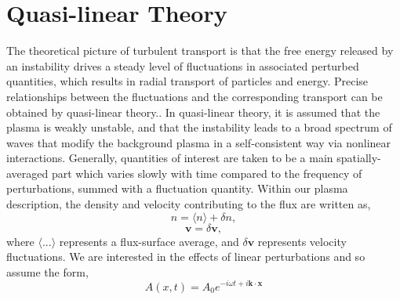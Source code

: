 \documentclass[12pt]{article}
\numberwithin{equation}{subsection}
\begin{document}
\section{Quasi-linear Theory}
   \quad The theoretical picture of turbulent transport is that the free energy released by an instability drives a steady level of
fluctuations in associated perturbed quantities, which results in radial transport of particles and energy. Precise relationships
between the fluctuations and the corresponding transport can be obtained by quasi-linear theory.\cite{WessonC}. In quasi-linear
theory, it is assumed that the plasma is weakly unstable, and that the instability leads to a broad spectrum of waves that modify
the background plasma in a self-consistent way via nonlinear interactions\cite{GurnBhatA}. Generally, quantities of interest are taken
to be a main spatially-averaged part which varies slowly with time compared to the frequency of perturbations, summed with a fluctuation
quantity. Within our plasma description, the density and velocity contributing to the flux are written as, 
   \begin{equation}
      n = \langle n \rangle + \delta n,
   \end{equation}
   \begin{equation}
      \bm{v} = \delta \bm{v},
   \end{equation}
where $\langle ... \rangle$ represents a flux-surface average, and $\delta \bm{v}$ represents velocity fluctuations. We are interested in
the effects of linear perturbations and so assume the form,   
   \begin{equation}
      A(x,t) = A_0e^{-i\omega t + i\bm{k}\cdot\bm{x}} 
   \end{equation}
\end{document}

